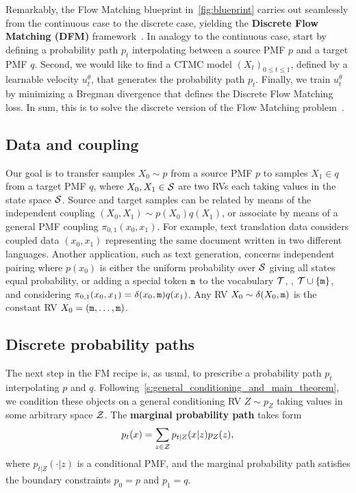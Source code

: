 \documentclass{fairmeta}
\newcommand{\highlight}[1]{{\color{metablue} \textbf{#1}}}
\renewcommand{\eqref}[1]{\labelcref{#1}}
\numberwithin{equation}{section}
\begin{document}
Remarkably, the Flow Matching blueprint in~\cref{fig:blueprint} carries out seamlessly from the continuous case to the discrete case, yielding the \highlight{Discrete Flow Matching (DFM)} framework~\citep{campbell2024generative, gat2024discrete}.
In analogy to the continuous case, start by defining a probability path $p_t$ interpolating between a source PMF $p$ and a target PMF $q$.
Second, we would like to find a CTMC model $(X_t)_{0\leq t \leq 1}$, defined by a learnable velocity $u^\theta_t$, that generates the probability path $p_t$.
Finally, we train $u^\theta_t$ by minimizing a Bregman divergence that defines the Discrete Flow Matching loss.
In sum, this is to solve the discrete version of the Flow Matching problem~\eqref{prob:gen_flow}.



\subsection{Data and coupling}

Our goal is to transfer samples $X_0\sim p$ from a source PMF $p$ to samples $X_1\in q$ from a target PMF $q$, where $X_0,X_1 \in{\mathcal{S}}$ are two RVs each taking values in the state space ${\mathcal{S}}$.
Source and target samples can be related by means of the independent coupling $(X_0,X_1)\sim p(X_0)q(X_1)$, or associate by means of a general PMF coupling $\pi_{0,1}(x_0,x_1)$.
For example, text translation data considers coupled data $(x_0, x_1)$ representing the same document written in two different languages. 
Another application, such as text generation, concerns independent pairing where $p(x_0)$ is either the uniform probability over ${\mathcal{S}}$ giving all states equal probability, or adding a special token $\texttt{m}$ to the vocabulary ${\mathcal{T}}$, \ie, ${\mathcal{T}}\cup \left\{\texttt{m}\right\}$, and considering $\pi_{0,1}(x_0,x_1) = \delta(x_0,\texttt{m})q(x_1)$. Any RV $X_0\sim \delta(X_0,\texttt{m})$ is the constant RV $X_0=(\texttt{m},\ldots,\texttt{m})$.


\subsection{Discrete probability paths}

The next step in the FM recipe is, as usual, to prescribe a probability path $p_t$ interpolating $p$ and $q$.
Following~\cref{s:general_conditioning_and_main_theorem}, we condition these objects on a general conditioning RV $Z \sim p_Z$ taking values in some arbitrary space ${\mathcal{Z}}$. 
The \highlight{marginal probability path} takes form
\begin{equation}\label{e:p_t_discrete}
    p_t(x) = \sum_{z \in \gZ} p_{t|Z}(x|z) p_Z(z), %
\end{equation}
where $p_{t|Z}(\cdot|z)$ is a conditional PMF, and the marginal probability path satisfies the boundary constraints $p_0=p$ and $p_1=q$.
\end{document}
